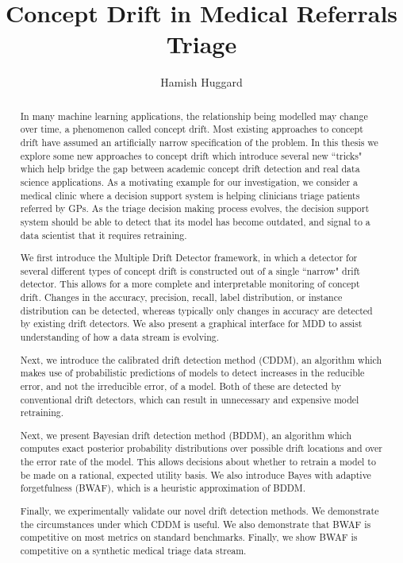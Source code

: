 \documentclass[12pt,examcopy]{uathesis}
\begin{document}
\title{Concept Drift in Medical Referrals Triage}
\author{Hamish Huggard}
\maketitle

\frontmatter
\begin{abstract}
In many machine learning applications, the relationship being modelled may change over time, a phenomenon called concept drift. Most existing approaches to concept drift have assumed an artificially narrow specification of the problem. In this thesis we explore some new approaches to concept drift which introduce several new ``tricks" which help bridge the gap between academic concept drift detection and real data science applications. As a motivating example for our investigation, we consider a medical clinic where a decision support system is helping clinicians triage patients referred by GPs. As the triage decision making process evolves, the decision support system should be able to detect that its model has become outdated, and signal to a data scientist that it requires retraining.

We first introduce the Multiple Drift Detector framework, in which a detector for several different types of concept drift is constructed out of a single ``narrow" drift detector. This allows for a more complete and interpretable monitoring of concept drift. Changes in the accuracy, precision, recall, label distribution, or instance distribution can be detected, whereas typically only changes in accuracy are detected by existing drift detectors. We also present a graphical interface for MDD to assist understanding of how a data stream is evolving.

Next, we introduce the calibrated drift detection method (CDDM), an algorithm which makes use of probabilistic predictions of models to detect increases in the reducible error, and not the  irreducible error, of a model. Both of these are detected by conventional drift detectors, which can result in unnecessary and expensive model retraining.

Next, we present Bayesian drift detection method (BDDM), an algorithm which computes exact posterior probability distributions over possible drift locations and over the error rate of the model. This allows decisions about whether to retrain a model to be made on a rational, expected utility basis. We also introduce Bayes with adaptive forgetfulness (BWAF), which is a heuristic approximation of BDDM.

Finally, we experimentally validate our novel drift detection methods. We demonstrate the circumstances under which CDDM is useful. We also demonstrate that BWAF is competitive on most metrics on standard benchmarks. Finally, we show BWAF is competitive on a synthetic medical triage data stream.
\end{abstract}
\end{document}
